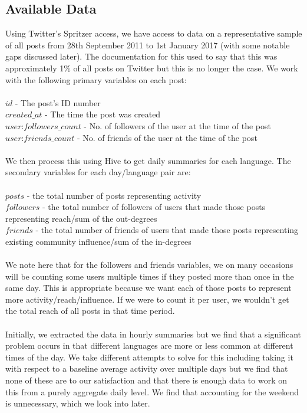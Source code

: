 \documentclass[12pt]{article}
\begin{document}
\subsection{Available Data}
Using Twitter's Spritzer access, we have access to data on a representative sample of all posts from 28th September 2011 to 1st January 2017 (with some notable gaps discussed later). The documentation for this used to say that this was approximately 1\% of all posts on Twitter but this is no longer the case. We work with the following primary variables on each post:\\\\
$id$ - The post's ID number\\
$created\_at$ - The time the post was created\\
$user$:$followers\_count$ - No. of followers of the user at the time of the post\\
$user$:$friends\_count$ - No. of friends of the user at the time of the post\\\\
We then process this using Hive to get daily summaries for each language. The secondary variables for each day/language pair are:\\\\
$posts$ - the total number of posts representing activity\\
$followers$ - the total number of followers of users that made those posts representing  reach/sum of the out-degrees\\
$friends$ - the total number of friends of users that made those posts representing existing community influence/sum of the in-degrees\\\\
We note here that for the followers and friends variables, we on many occasions will be counting some users multiple times if they posted more than once in the same day. This is appropriate because we want each of those posts to represent more activity/reach/influence. If we were to count it per user, we wouldn't get the total reach of all posts in that time period.\\\\
Initially, we extracted the data in hourly summaries but we find that a significant problem occurs in that different languages are more or less common at different times of the day. We take different attempts to solve for this including taking it with respect to a baseline average activity over multiple days but we find that none of these are to our satisfaction and that there is enough data to work on this from a purely aggregate daily level. We find that accounting for the weekend is unnecessary, which we look into later.
\end{document}

